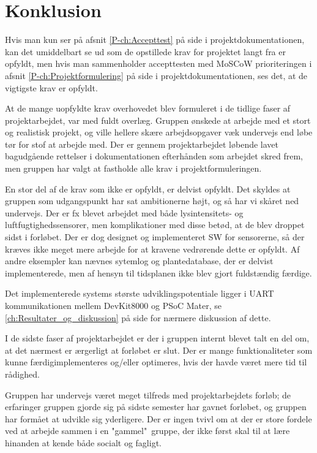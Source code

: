\chapter{Konklusion}
\label{ch:Konklusion}

Hvis man kun ser på afsnit \ref{P-ch:Accepttest}  på side \pageref{P-ch:Accepttest} i projektdokumentationen, kan det umiddelbart se ud som de opstillede krav for projektet langt fra er opfyldt, men hvis man sammenholder accepttesten med MoSCoW prioriteringen i afsnit \ref{P-ch:Projektformulering}  på side \pageref{P-ch:Projektformulering} i projektdokumentationen, ses det, at de vigtigste krav er opfyldt. 

At de mange uopfyldte krav overhovedet blev formuleret i de tidlige faser af projektarbejdet, var med fuldt overlæg. 
Gruppen ønskede at arbejde med et stort og realistisk projekt, og ville hellere skære arbejdsopgaver væk undervejs end løbe tør for stof at arbejde med. 
Der er gennem projektarbejdet løbende lavet bagudgående rettelser i dokumentationen efterhånden som arbejdet skred frem, men gruppen har valgt at fastholde alle krav i projektformuleringen. 

En stor del af de krav som ikke er opfyldt, er delvist opfyldt. 
Det skyldes at gruppen som udgangspunkt har sat ambitionerne højt, og så har vi skåret ned undervejs. 
Der er fx blevet arbejdet med både lysintensitets- og luftfugtighedssensorer, men komplikationer med disse betød, at de blev droppet sidst i forløbet. 
Der er dog designet og implementeret SW for sensorerne, så der kræves ikke meget mere arbejde for at kravene vedrørende dette er opfyldt. 
Af andre eksempler kan nævnes sytemlog og plantedatabase, der er delvist implementerede, men af hensyn til tidsplanen ikke blev gjort fuldstændig færdige. 

Det implementerede systems største udviklingspotentiale ligger i UART kommunikationen mellem DevKit8000 og PSoC Mater, se \ref{ch:Resultater_og_diskussion}  på side \pageref{ch:Resultater_og_diskussion} for nærmere diskussion af dette. 

I de sidste faser af projektarbejdet er der i gruppen internt blevet talt en del om, at det nærmest er ærgerligt at forløbet er slut. 
Der er mange funktionaliteter som kunne færdigimplementeres og/eller optimeres, hvis der havde været mere tid til rådighed. 

\mbox{}

Gruppen har undervejs været meget tilfreds med projektarbejdets forløb; de erfaringer gruppen gjorde sig på sidste semester har gavnet forløbet, og gruppen har formået at udvikle sig yderligere. 
Der er ingen tvivl om at der er store fordele ved at arbejde sammen i en "gammel"\ gruppe, der ikke først skal til at lære hinanden at kende både socialt og fagligt. 

